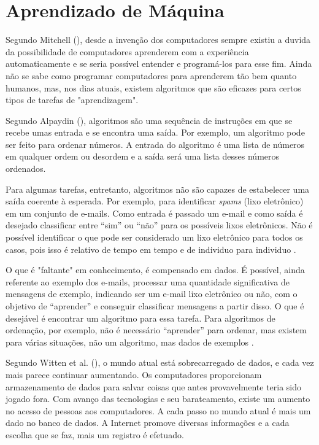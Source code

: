 \section{Aprendizado de Máquina}
\label{machineLearning}

Segundo Mitchell (\citeyear{Mitchell:1997:ML:541177}), desde a invenção dos computadores sempre existiu a duvida da possibilidade de computadores aprenderem com a experiência automaticamente e se seria possível entender e programá-los para esse fim. Ainda não se sabe como programar computadores para aprenderem tão bem quanto humanos, mas, nos dias atuais, existem algoritmos que são eficazes para certos tipos de tarefas de "aprendizagem". 

Segundo Alpaydin (\citeyear{Alpaydin:2010:IML:1734076}), algoritmos são uma sequência de instruções em que se recebe umas entrada e se encontra uma saída. Por exemplo, um algoritmo pode ser feito para ordenar números. A entrada do algoritmo é uma lista de números em qualquer ordem ou desordem e a saída será uma lista desses números ordenados.

Para algumas tarefas, entretanto, algoritmos não são capazes de estabelecer uma saída coerente à esperada. Por exemplo, para identificar \textit{spams} (lixo eletrônico) em um conjunto de e-mails. Como entrada é passado um e-mail e como saída é desejado classificar entre “sim” ou “não” para os possíveis lixos eletrônicos. Não é possível identificar o que pode ser considerado um lixo eletrônico para todos os casos, pois isso é relativo de tempo em tempo e de individuo para individuo \cite{Alpaydin:2010:IML:1734076}.

O que é "faltante" em conhecimento, é compensado em dados. É possível, ainda referente ao exemplo dos e-mails, processar uma quantidade significativa de mensagens de exemplo, indicando ser um e-mail lixo eletrônico ou não, com o objetivo de “aprender” e conseguir classificar mensagens a partir disso. O que é desejável é encontrar um algoritmo para essa tarefa. Para algoritmos de ordenação, por exemplo, não é necessário “aprender” para ordenar, mas existem para várias situações, não um algoritmo, mas dados de exemplos \cite{Alpaydin:2010:IML:1734076}.


Segundo Witten et al. (\citeyear{Witten:2016:DMF:3086818}), o mundo atual está sobrecarregado de dados, e cada vez mais parece continuar aumentando. Os computadores proporcionam armazenamento de dados para salvar coisas que antes provavelmente teria sido jogado fora. Com avanço das tecnologias e seu barateamento, existe um aumento no acesso de pessoas aos computadores. A cada passo no mundo atual é mais um dado no banco de dados. A Internet promove diversas informações e a cada escolha que se faz, mais um registro é efetuado.	

